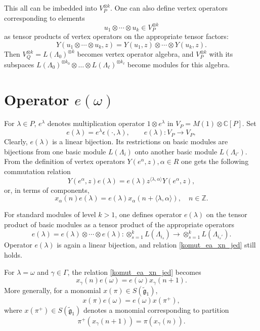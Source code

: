 \documentclass[a4paper, 10pt,oneside]{amsart}
\begin{document}
This all can be imbedded into $V_P^{\otimes k}$. One can also
define vertex operators corresponding to elements
$$u_1\otimes\cdots\otimes u_k\in V_P^{\otimes k}$$
as tensor products of vertex operators on the appropriate tensor
factors:
$$Y(u_1\otimes\cdots\otimes u_k,z)=Y(u_1,z)\otimes\cdots\otimes
Y(u_k,z).$$ Then $V_Q^{\otimes k}=L(\Lambda_0)^{\otimes k}$
becomes vertex operator algebra, and $V_P^{\otimes k}$ with its
subspaces $L(\Lambda_0)^{\otimes k_0}\otimes\dots\otimes
 L(\Lambda_\ell)^{\otimes k_\ell}$ become modules for this algebra.

\section{Operator $e(\omega)$}

For $\lambda\in P$, $e^\lambda$ denotes multiplication operator
$1\otimes e^\lambda$ in $V_P=M(1)\otimes {{\mathbb C}} [P]$. Set
$$e(\lambda)=e^\lambda \epsilon(\cdot,\lambda),\qquad e(\lambda):V_P\to V_P,$$
Clearly, $e(\lambda)$ is a linear bijection. Its restrictions on
basic modules are bijections from one basic module
$L(\Lambda_i)$ onto another basic module $L(\Lambda_{i'})$. From the
definition of vertex operators $Y(e^\alpha,z),\alpha\in R$ one gets
the following commutation relation
$$Y(e^\alpha,z)e(\lambda)=e(\lambda)
z^{\langle\lambda,\alpha\rangle} Y(e^\alpha,z),$$ or, in terms of
components,
\begin{equation} x_\alpha(n)
e(\lambda)=e(\lambda) x_\alpha(n+\langle\lambda,\alpha\rangle),\quad
n\in{{\mathbb Z}}. \label{komut_ea_xn_jed}\end{equation}

For standard modules of level $k>1$, one defines operator
$e(\lambda)$ on the tensor product of basic modules as a tensor
product of the appropriate operators
$$e(\lambda)=e(\lambda)\otimes\cdots\otimes e(\lambda): \otimes_{s=1}^k L(\Lambda_{i_s})\to \otimes_{s=1}^k L(\Lambda_{i_s'}).$$
Operator $e(\lambda)$ is again a linear bijection, and relation
\eqref{komut_ea_xn_jed} still holds.

For $\lambda=\omega$ and $\gamma\in \Gamma$, the relation
\eqref{komut_ea_xn_jed} becomes
$$x_\gamma(n) e(\omega)=e(\omega)
x_\gamma(n+1).$$ More generally, for a monomial $x(\pi)\in
S({\tilde{{\mathfrak g}}}_1)$, $$x(\pi)e(\omega)=e(\omega) x(\pi^+),$$ where
$x(\pi^+)\in S({\tilde{{\mathfrak g}}}_1)$ denotes a monomial corresponding to partition
\begin{equation} \label{xpiplus_def}
\pi^+(x_\gamma(n+1))=\pi(x_\gamma(n)).
\end{equation}
\end{document}
